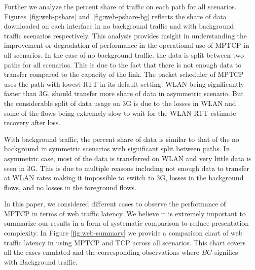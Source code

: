Further we analyze the percent share of traffic on each path for all scenarios. Figures~\ref{fig:web-pshare} and~\ref{fig:web-pshare-bg} reflects the 
share of data downloaded on each interface in no background traffic and with background traffic scenarios respectively. This analysis provides insight
in understanding the improvement or degradation of performance in the operational use of MPTCP in all scenarios. In the case of no background traffic,
the data is split between two paths for all scenarios. This is due to the fact that there is not enough data to transfer compared to the capacity of the
link. The packet scheduler of MPTCP uses the path with lowest RTT in its default setting. WLAN being significantly faster than 3G, should transfer more share 
of data in asymmetric scenario. But the considerable split of data usage on 3G is due to the losses in WLAN and some of the flows being extremely
slow to wait for the WLAN RTT estimate recovery after loss.

With background traffic, the percent share of data is similar to that of the no background in symmetric scenarios with significant split between paths.
In asymmetric case, most of the data is transferred on WLAN and very little data is seen in 3G. This is due to multiple reasons including not enough data 
to transfer at WLAN rates making it impossible to switch to 3G, losses in the background flows, and no losses in the foreground flows.

In this paper, we considered different cases to observe the performance of MPTCP in terms of web traffic latency. We believe it is extremely important to
summarize our results in a form of systematic comparison to reduce presentation complexity. In Figure \ref{fig:web-summary} we provide a comparison 
chart of web traffic latency in using MPTCP and TCP across all scenarios. This chart covers all the cases emulated and the corresponding observations where $BG$ 
signifies with Background traffic. 
